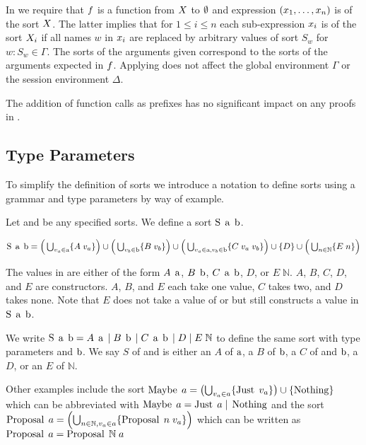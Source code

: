 In \RSideEffect we require that $f$ is a function from $X$ to $\emptyset$ and expression $\left(x_1,\ldots,x_n\right)$ is of the sort $X$.
The latter implies that for $1 \leq i \leq n$ each sub-expression $x_i$ is of the sort $X_i$ if all names $w$ in $x_i$ are replaced by arbitrary values of sort $S_w$ for $w:S_w \in \Gamma$.
The sorts of the arguments given correspond to the sorts of the arguments expected in $f$.
Applying \RSideEffect does not affect the global environment $\Gamma$ or the session environment $\Delta$.

The addition of function calls as prefixes has no significant impact on any proofs in \cite{PetersEtal21}.

\subsection{Type Parameters}
To simplify the definition of sorts we introduce a notation to define sorts using a grammar and type parameters by way of example.

Let \TypeParamA and \TypeParamB be any specified sorts.
We define a sort $\operatorname{S}\;\operatorname{a}\;\operatorname{b}$.

\[\operatorname{S}\;\operatorname{a}\;\operatorname{b} = \textstyle\Big(\bigcup_{v_a\in\operatorname{a}}\{A\; v_a\}\Big) \cup \Big(\bigcup_{v_b\in\operatorname{b}}\{B\; v_b\}\Big) \cup \Big(\bigcup_{v_a\in\operatorname{a} , v_b\in\operatorname{b}}\{C\; v_a\; v_b\}\Big)\cup\{D\}\cup\Big(\bigcup_{n\in\mathbb{N}}\{E\; n\}\Big)\]

The values in \Sab are either of the form $A\;\operatorname{a}$, $B\;\operatorname{b}$, $C\;\operatorname{a}\;\operatorname{b}$, $D$, or $E\;\mathbb{N}$.
$A$, $B$, $C$, $D$, and $E$ are constructors.
$A$, $B$, and $E$ each take one value, $C$ takes two, and $D$ takes none.
Note that $E$ does not take a value of \TypeParamA or \TypeParamB but still constructs a value in $\operatorname{S}\;\operatorname{a}\;\operatorname{b}$.

We write $\operatorname{S}\;\operatorname{a}\;\operatorname{b} = A\;\operatorname{a} \; | \; B\;\operatorname{b} \; | \; C\;\operatorname{a}\;\operatorname{b} \; | \; D \; | \; E\;\mathbb{N}$ to define the same sort \Sab with type parameters \TypeParamA and $\operatorname{b}$.
We say $S$ of \TypeParamA and \TypeParamB is either an $A$ of $\operatorname{a}$, a $B$ of $\operatorname{b}$, a $C$ of \TypeParamA and $\operatorname{b}$, a $D$, or an $E$ of $\mathbb{N}$.

Other examples include the sort $\operatorname{Maybe}\; a = \left(\bigcup_{v_a\in a}\{\operatorname{Just}\; v_a\}\right) \cup \{\operatorname{Nothing}\}$ which can be abbreviated with $\operatorname{Maybe}\; a = \operatorname{Just}\; a\; | \;\operatorname{Nothing}$
and the sort $\operatorname{Proposal}\; a = \left(\bigcup_{n\in\mathbb{N}, v_a\in a}\{\operatorname{Proposal}\; n\; v_a\}\right)$ which can be written as $\operatorname{Proposal}\; a = \operatorname{Proposal}\; \mathbb{N}\; a$
